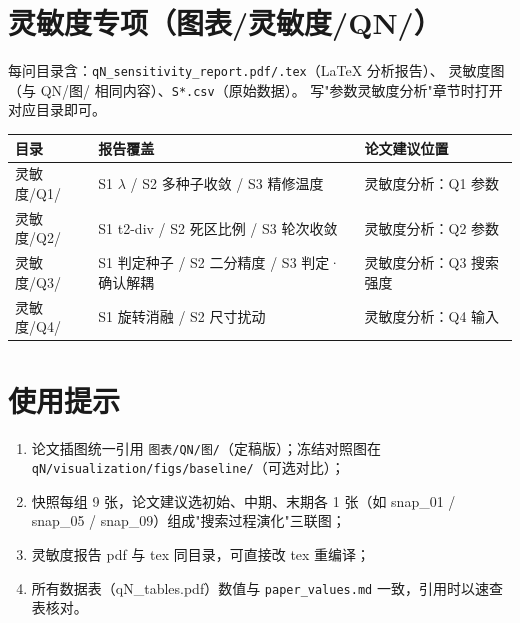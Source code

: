 \documentclass[12pt,a4paper]{article}
\begin{document}
\section{灵敏度专项（图表/灵敏度/QN/）}

每问目录含：\texttt{qN\_sensitivity\_report.pdf/.tex}（LaTeX 分析报告）、
灵敏度图（与 QN/图/ 相同内容）、\texttt{S*.csv}（原始数据）。
写"参数灵敏度分析"章节时打开对应目录即可。

\begin{table}[H]
\centering
\scriptsize
\setlength{\tabcolsep}{1.5pt}
\begin{tabular}{>{\raggedright\arraybackslash}p{4.4cm}>{\raggedright\arraybackslash}p{7.6cm}>{\raggedright\arraybackslash}p{3.4cm}}
\toprule
目录 & 报告覆盖 & 论文建议位置 \\
\midrule
灵敏度/Q1/ & S1 $\lambda$ / S2 多种子收敛 / S3 精修温度 & 灵敏度分析：Q1 参数 \\
灵敏度/Q2/ & S1 t2-div / S2 死区比例 / S3 轮次收敛 & 灵敏度分析：Q2 参数 \\
灵敏度/Q3/ & S1 判定种子 / S2 二分精度 / S3 判定·确认解耦 & 灵敏度分析：Q3 搜索强度 \\
灵敏度/Q4/ & S1 旋转消融 / S2 尺寸扰动 & 灵敏度分析：Q4 输入 \\
\bottomrule
\end{tabular}
\end{table}

\section{使用提示}

\begin{enumerate}
    \item 论文插图统一引用 \texttt{图表/QN/图/}（定稿版）；冻结对照图在
    \texttt{qN/visualization/\allowbreak{}figs/\allowbreak{}baseline/}（可选对比）；
    \item 快照每组 9 张，论文建议选初始、中期、末期各 1 张（如
    snap\_01 / snap\_05 / snap\_09）组成"搜索过程演化"三联图；
    \item 灵敏度报告 pdf 与 tex 同目录，可直接改 tex 重编译；
    \item 所有数据表（qN\_tables.pdf）数值与 \texttt{paper\_values.md}
    一致，引用时以速查表核对。
\end{enumerate}
\end{document}
